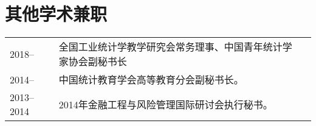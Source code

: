 \documentclass[twoside,a4paper,10pt]{amsart}
\begin{document}
\section*{其他学术兼职}
\begin{tabular}{l p{} l}
  2018--     & 全国工业统计学教学研究会常务理事、中国青年统计学家协会副秘书长 \\
  2014--     & 中国统计教育学会高等教育分会副秘书长。                         \\
  2013--2014 & 2014年金融工程与风险管理国际研讨会执行秘书。                   \\

\end{tabular}


\end{document}
